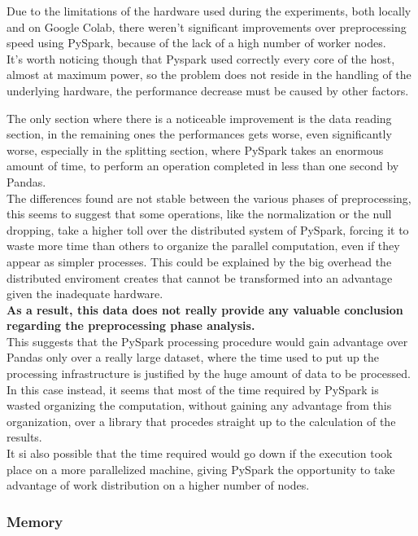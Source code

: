 \documentclass[
	letterpaper, %
	10pt, %
]{class}
\begin{document}
Due to the limitations of the hardware used during the experiments, both locally and on Google Colab, there weren't significant improvements over preprocessing speed using PySpark, because of the lack of a high number of worker nodes.\\
It's worth noticing though that Pyspark used correctly every core of the host, almost at maximum power, so the problem does not reside in the handling of the underlying hardware, the performance decrease must be caused by other factors.

The only section where there is a noticeable improvement is the data reading section, in the remaining ones the performances gets worse, even significantly worse, especially in the splitting section, where PySpark takes an enormous amount of time, to perform
an operation completed in less than one second by Pandas.\\

The differences found are not stable between the various phases of preprocessing, this seems to suggest that some operations, like the normalization or the null dropping, take a higher toll over the distributed system of PySpark,
forcing it to waste more time than others to organize the parallel computation, even if they appear as simpler processes.
This could be explained by the big overhead the distributed enviroment creates that cannot be transformed into an advantage given the inadequate hardware.\\

\textbf{As a result, this data does not really provide any valuable conclusion regarding the preprocessing phase analysis.}\\

This suggests that the PySpark processing procedure would gain advantage over Pandas only over a really large dataset, where the time used to put up the processing infrastructure is justified by the huge amount of data to be processed.
In this case instead, it seems that most of the time required by PySpark is wasted organizing the computation, without gaining any advantage from this organization, over a library that procedes straight up to the calculation of the results.\\

It si also possible that the time required would go down if the execution took place on a more parallelized machine, giving PySpark the opportunity to take advantage of work distribution on a higher number of nodes.
\subsubsection{Memory}
\end{document}
